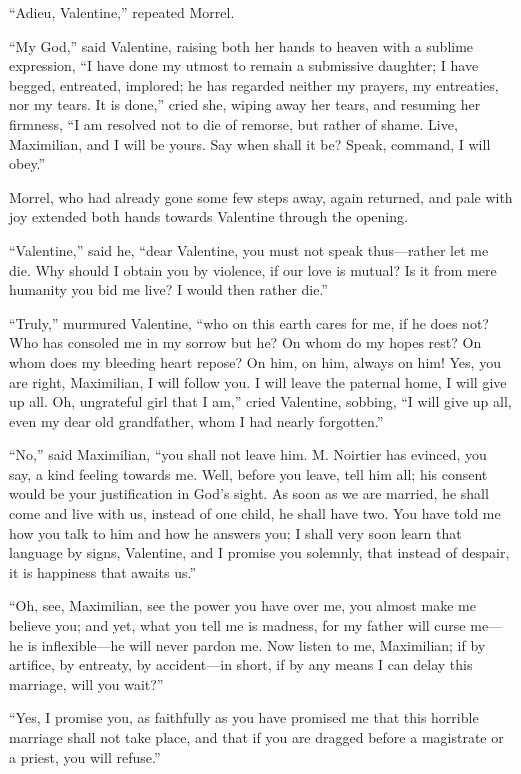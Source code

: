 “Adieu, Valentine,” repeated Morrel.

“My God,” said Valentine, raising both her hands to heaven with a
sublime expression, “I have done my utmost to remain a submissive
daughter; I have begged, entreated, implored; he has regarded neither
my prayers, my entreaties, nor my tears. It is done,” cried she, wiping
away her tears, and resuming her firmness, “I am resolved not to die of
remorse, but rather of shame. Live, Maximilian, and I will be yours.
Say when shall it be? Speak, command, I will obey.”

Morrel, who had already gone some few steps away, again returned, and
pale with joy extended both hands towards Valentine through the
opening.

“Valentine,” said he, “dear Valentine, you must not speak thus—rather
let me die. Why should I obtain you by violence, if our love is mutual?
Is it from mere humanity you bid me live? I would then rather die.”

“Truly,” murmured Valentine, “who on this earth cares for me, if he
does not? Who has consoled me in my sorrow but he? On whom do my hopes
rest? On whom does my bleeding heart repose? On him, on him, always on
him! Yes, you are right, Maximilian, I will follow you. I will leave
the paternal home, I will give up all. Oh, ungrateful girl that I am,”
cried Valentine, sobbing, “I will give up all, even my dear old
grandfather, whom I had nearly forgotten.”

“No,” said Maximilian, “you shall not leave him. M. Noirtier has
evinced, you say, a kind feeling towards me. Well, before you leave,
tell him all; his consent would be your justification in God’s sight.
As soon as we are married, he shall come and live with us, instead of
one child, he shall have two. You have told me how you talk to him and
how he answers you; I shall very soon learn that language by signs,
Valentine, and I promise you solemnly, that instead of despair, it is
happiness that awaits us.”

“Oh, see, Maximilian, see the power you have over me, you almost make
me believe you; and yet, what you tell me is madness, for my father
will curse me—he is inflexible—he will never pardon me. Now listen to
me, Maximilian; if by artifice, by entreaty, by accident—in short, if
by any means I can delay this marriage, will you wait?”

“Yes, I promise you, as faithfully as you have promised me that this
horrible marriage shall not take place, and that if you are dragged
before a magistrate or a priest, you will refuse.”

